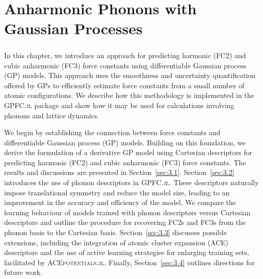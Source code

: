\chapter{Anharmonic Phonons with Gaussian Processes} \label{ch:3}

\paragraph{}

In this chapter, we introduce an approach for predicting harmonic (FC2) and cubic anharmonic (FC3) force constants using differentiable Gaussian process (GP) models.
This approach uses the smoothness and uncertainty quantification offered by GPs to efficiently estimate force constants from a small number of atomic configurations.
We describe how this methodology is implemented in the \textsc{GPFC.jl} package and show how it may be used for calculations involving phonons and lattice dynamics.

We begin by establishing the connection between force constants and differentiable Gaussian process (GP) models. Building on this foundation, we derive the formulation of a derivative GP model using Cartesian descriptors for predicting harmonic (FC2) and cubic anharmonic (FC3) force constants. The results and discussions are presented in Section~\ref{sec:3.1}.
Section~\ref{sec:3.2} introduces the use of phonon descriptors in \textsc{GPFC.jl}. 
These descriptors naturally impose translational symmetry and reduce the model size, leading to an improvement in the accuracy and efficiency of the model.  
We compare the learning behaviour of models trained with phonon descriptors versus Cartesian descriptors and outline the procedure for recovering FC2s and FC3s from the phonon basis to the Cartesian basis.
Section~\ref{sec:3.3} discusses possible extensions, including the integration of atomic cluster expansion (ACE) descriptors and the use of active learning strategies for enlarging training sets, facilitated by \textsc{ACEpotentials.jl}.
Finally, Section~\ref{sec:3.4} outlines directions for future work.


